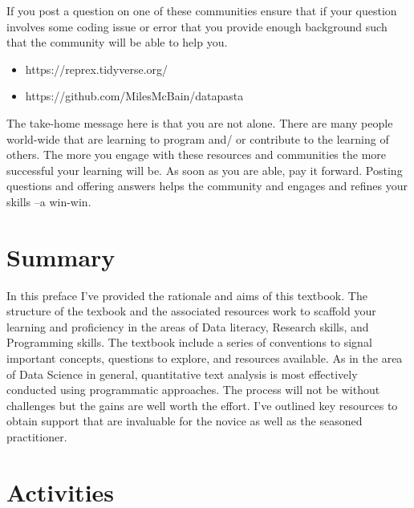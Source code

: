 \documentclass[
  letterpaper,
]{scrbook}
\begin{document}
If you post a question on one of these communities ensure that if your
question involves some coding issue or error that you provide enough
background such that the community will be able to help you.

\begin{itemize}
\item
  https://reprex.tidyverse.org/
\item
  https://github.com/MilesMcBain/datapasta
\end{itemize}

The take-home message here is that you are not alone. There are many
people world-wide that are learning to program and/ or contribute to the
learning of others. The more you engage with these resources and
communities the more successful your learning will be. As soon as you
are able, pay it forward. Posting questions and offering answers helps
the community and engages and refines your skills --a win-win.

\hypertarget{summary}{%
\section*{Summary}\label{summary}}


In this preface I've provided the rationale and aims of this textbook.
The structure of the texbook and the associated resources work to
scaffold your learning and proficiency in the areas of Data literacy,
Research skills, and Programming skills. The textbook include a series
of conventions to signal important concepts, questions to explore, and
resources available. As in the area of Data Science in general,
quantitative text analysis is most effectively conducted using
programmatic approaches. The process will not be without challenges but
the gains are well worth the effort. I've outlined key resources to
obtain support that are invaluable for the novice as well as the
seasoned practitioner.

\hypertarget{activities}{%
\section*{Activities}\label{activities}}

\end{document}
